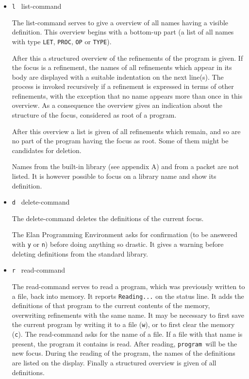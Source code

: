 \begin{itemize}
Special form of tracing execute-command, in which the types
of the syntactical constructs are shown rather than their values.
This mode is recognized by the request {\tt Verify command, please...}
on the status line. See section 5.5 for a further description
of the verify-mood.
\item{\tt l } list-command

The list-command serves to give a overview of all names having
a visible definition. This overview begins with a bottom-up
part (a list of all names with type {\tt LET}, {\tt PROC}, {\tt OP}
or {\tt TYPE}).

After this a structured overview of the refinements of the program
is given. If the focus is a refinement, the names of all refinements
which appear in its body are displayed with a suitable indentation
on the next line(s). The process is invoked recursively if a
refinement is expressed in terms of other refinements, with
the exception that no name appears more than once in this overview.
As a consequence the overview gives an indication about the structure
of the focus, considered as root of a program.

After this overview a list is given of all refinements which
remain, and so are no part of the program having the focus as
root. Some of them might be candidates for deletion.

Names from the built-in library (see appendix A) and
from a packet are not listed.
It is however possible to focus on a library name and show its
definition.
\item{\tt d } delete-command

The delete-command deletes the definitions of the current focus.

The Elan Programming Environment asks for confirmation (to be
answered with {\tt y} or {\tt n}) before doing anything so drastic.
It gives a warning before deleting definitions from the standard
library.
\item{\tt r } read-command

The read-command serves to read a program, which was previously
written to a file, back into memory. It reports {\tt Reading...} on
the status line. It adds the definitions of that program to
the current contents of the memory, overwriting refinements with
the same name. It may be necessary to first save the current
program by writing it to a file ({\tt w}), or to first clear
the memory ({\tt c}). The read-command asks for the name of a
file. If a file with that name is present, the program it contains
is read. After reading, {\tt program }will be the new focus.
During the reading of the program, the names of the definitions
are listed on the display. Finally a structured overview is
given of all definitions. 


\end{itemize}

